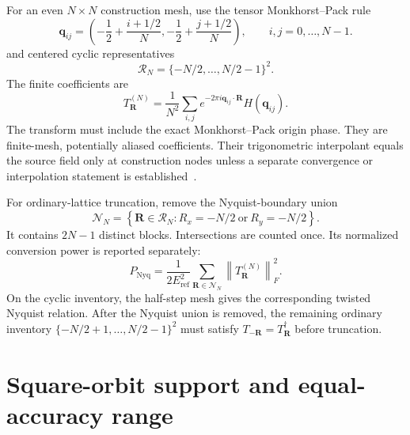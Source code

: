 \documentclass[11pt]{article}
\newcommand{\norm}[1]{\left\lVert #1\right\rVert}
\begin{document}
For an even $N\times N$ construction mesh, use the tensor Monkhorst--Pack rule
\begin{equation}
 \mathbf q_{ij}=\left(-\frac12+\frac{i+1/2}{N},
                         -\frac12+\frac{j+1/2}{N}\right),
 \qquad i,j=0,\ldots,N-1.
\end{equation}
and centered cyclic representatives
\begin{equation}
 \mathcal R_N=\{-N/2,\ldots,N/2-1\}^2.
\end{equation}
The finite coefficients are
\begin{equation}
 T_{\mathbf R}^{(N)}=
 \frac{1}{N^2}\sum_{i,j}
 e^{-2\pi i\mathbf q_{ij}\cdot\mathbf R}H(\mathbf q_{ij}).
\end{equation}
The transform must include the exact Monkhorst--Pack origin phase.  They are finite-mesh,
potentially aliased coefficients. Their trigonometric interpolant
equals the source field only at construction nodes unless a separate convergence or
interpolation statement is established~\cite{trefethen2000,higham2002}.

For ordinary-lattice truncation, remove the Nyquist-boundary union
\begin{equation}
 \mathcal N_N=
 \left\{\mathbf R\in\mathcal R_N:
 R_x=-N/2\ \text{or}\ R_y=-N/2\right\}.
 \label{eq:nyquist-set}
\end{equation}
It contains $2N-1$ distinct blocks. Intersections are counted once. Its normalized
conversion power is reported separately:
\begin{equation}
 P_{\mathrm{Nyq}}=
 \frac{1}{2E_{\mathrm{ref}}^2}
 \sum_{\mathbf R\in\mathcal N_N}\norm{T_{\mathbf R}^{(N)}}_F^2.
\end{equation}
On the cyclic inventory, the half-step mesh gives the corresponding twisted Nyquist
relation.  After the Nyquist union is removed, the remaining ordinary inventory
$\{-N/2+1,\ldots,N/2-1\}^2$ must satisfy
$T_{-\mathbf R}=T_{\mathbf R}^\dagger$ before truncation.

\section{Square-orbit support and equal-accuracy range}
\end{document}
